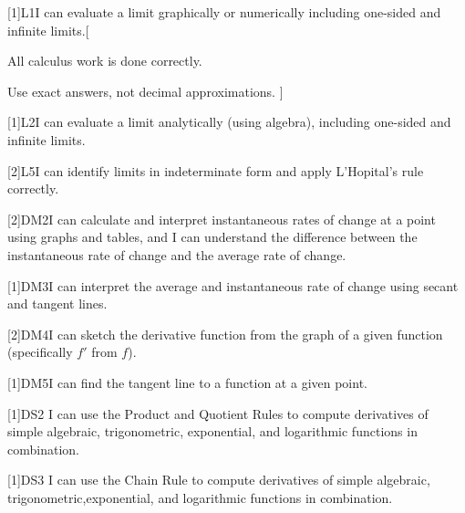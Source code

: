 [1]{L1}{I can evaluate a limit graphically or numerically including one-sided and infinite limits.}[
    \item All calculus work is done correctly. \item Use exact answers, not decimal approximations.
]

[1]{L2}{I can evaluate a limit analytically (using algebra), including one-sided and infinite limits.}



[2]{L5}{I can identify limits in indeterminate form and apply L'Hopital's rule correctly.}



[2]{DM2}{I can calculate and interpret instantaneous rates of
  change at a point using graphs and tables, and I can understand the difference
  between the instantaneous rate of change and the average rate of change.}

[1]{DM3}{I can interpret the average and instantaneous rate of
change using secant and tangent lines.}

[2]{DM4}{I can sketch the derivative function from the graph of a
given function (specifically $f'$ from $f$).}


[1]{DM5}{I can find the tangent line to a function at a given
point.}





[1]{DS2}{%
I can use the Product and Quotient Rules to compute derivatives of simple algebraic, trigonometric, exponential, and logarithmic functions in combination.
}


[1]{DS3}{%
I can use the Chain Rule to compute derivatives of simple algebraic, trigonometric,exponential, and logarithmic functions in combination.
}


